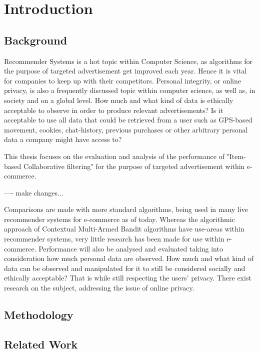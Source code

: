 \chapter{Introduction}

\section{Background}

Recommender Systems is a hot topic within Computer Science, as algorithms for the purpose of targeted advertisement get improved each year. Hence it is vital for companies to keep up with their competitors. Personal integrity, or online privacy, is also a frequently discussed topic within computer science, as well as, in society and on a global level. How much and what kind of data is ethically acceptable to observe in order to produce relevant advertisements? Is it acceptable to use all data that could be retrieved
from a user such as GPS-based movement, cookies, chat-history, previous purchases or other arbitrary personal data a company might have access to?

This thesis focuses on the evaluation and analysis of the performance of "Item-based Collaborative filtering" for the purpose of targeted advertisement within e-commerce.

---- make changes...

Comparisons are made with more standard algorithms, being used in many live recommender systems for e-commerce as of today. Whereas the algorithmic approach of Contextual Multi-Armed Bandit algorithms have use-areas within recommender systems, very little research has been made for use within e-commerce. Performance will also be analysed and evaluated taking into consideration how much personal data are observed. How much and what kind of data can be observed and manipulated for it to still be considered socially and ethically acceptable? That is while still respecting the users’ privacy. There exist research on the subject, addressing the issue of online privacy.

\cite{park2012literature}

\section{Methodology}

\section{Related Work}

